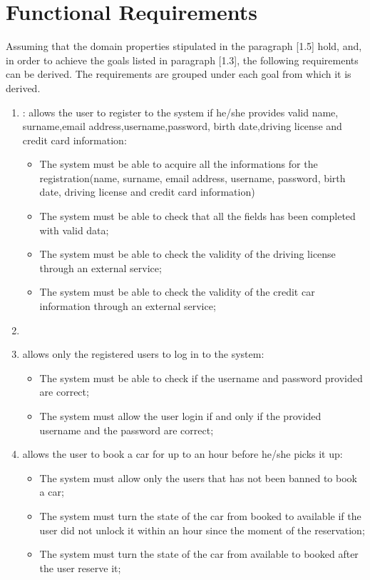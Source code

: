 \section{Functional Requirements}
Assuming that the domain properties stipulated in the paragraph [1.5] hold, and, in order to achieve the goals listed in paragraph [1.3], the following requirements can be derived. The requirements are grouped under each goal from which it is derived.

\begin{enumerate}

\item: allows the user to register to the system if he/she provides valid name, surname,email address,username,password, birth date,driving license and credit card information:

\begin{itemize}
\item The system must be able to acquire all the informations for the registration(name, surname, email address, username, password, birth date, driving license and credit card information)
\item The system must be able to check that all the fields has been completed with valid data;
\item The system must be able to check the validity of the driving license through an external service;
\item The system must be able to check the validity of the credit car information through an external service;
\end{itemize}

\item \item allows only the registered users to log in to the system:

\begin{itemize}
\item The system must be able to check if the username and password provided are correct;
\item The system must allow the user login if and only if the provided username and the password are correct;
\end{itemize}

\item allows the user to book a car for up to an hour before he/she picks it up:

\begin{itemize}
\item The system must allow only the users that has not been banned to book a car;
\item The system must turn the state of the car from booked to available if the user did not unlock it within an hour since the moment of the reservation;
\item The system must turn the state of the car from available to booked after the user reserve it;
\end{itemize}


\end{enumerate}
